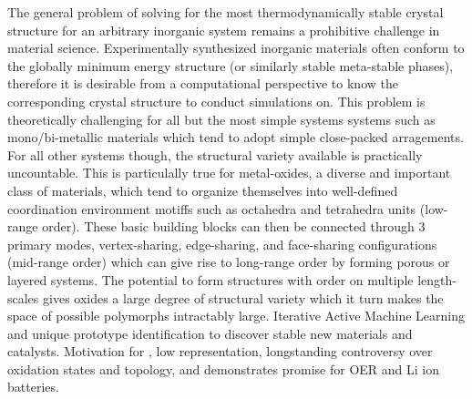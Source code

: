 

The general problem of solving for the most thermodynamically stable crystal structure for an arbitrary inorganic system remains a prohibitive challenge in material science.
%
Experimentally synthesized inorganic materials often conform to the globally minimum energy structure (or similarly stable meta-stable phases),
therefore it is desirable from a computational perspective to know the corresponding crystal structure to conduct simulations on.
%
This problem is theoretically challenging for all but the most simple systems systems such as mono/bi-metallic materials which tend to adopt simple close-packed arragements.
%
For all other systems though, the structural variety available is practically uncountable.
%
This is particulally true for metal-oxides, a diverse and important class of materials, which tend to organize themselves into well-defined coordination environment motiffs such as octahedra and tetrahedra units (low-range order).
%
These basic building blocks can then be connected through 3 primary modes, vertex-sharing, edge-sharing, and face-sharing configurations (mid-range order) which can give rise to long-range order by forming porous or layered systems.
%
The potential to form structures with order on multiple length-scales gives oxides a large degree of structural variety which it turn makes the space of possible polymorphs intractably large.
Iterative Active Machine Learning and unique prototype identification to discover stable new materials and catalysts.
%
Motivation for , low representation, longstanding controversy over oxidation states and topology, and demonstrates promise for OER and Li ion batteries.


